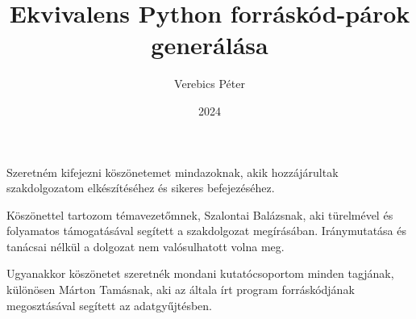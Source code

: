 \documentclass[
	parspace, %
	noindent, %
	nohyp, %
]{elteikthesis}[2023/04/10]
\title{Ekvivalens Python forráskód-párok generálása} %
\date{2024} %
\author{Verebics Péter}
\affiliation{doktorandusz} %
\begin{document}


\maketitle
%

\tableofcontents
\cleardoublepage


\cleardoublepage


\cleardoublepage


\cleardoublepage


\cleardoublepage

\chapter*{\acklabel}
Szeretném kifejezni köszönetemet mindazoknak, akik hozzájárultak 
szakdolgozatom elkészítéséhez és sikeres befejezéséhez.

Köszönettel tartozom témavezetőmnek, Szalontai Balázsnak,
aki türelmével és folyamatos támogatásával segített a szakdolgozat megírásában.
Iránymutatása és tanácsai nélkül a dolgozat nem valósulhatott volna meg.

Ugyanakkor köszönetet szeretnék mondani kutatócsoportom minden tagjának,
különösen Márton Tamásnak,
aki az általa írt program forráskódjának megosztásával
segített az adatgyűjtésben.

\appendix
%

{}
\printbibliography[title=\biblabel]
\cleardoublepage
\end{document}
